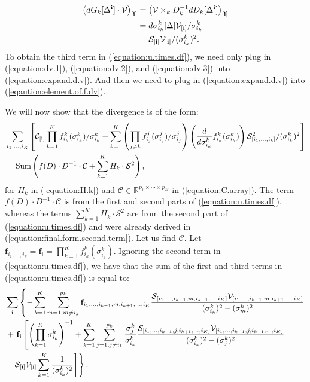 \begin{align}
  \left(dG_k[\Delta^{\bf i}] \cdot \mathcal{V}\right)_{[\mathbf{i}]} &= \left(\mathcal{V} \times_k D_k^{-1}dD_k[\Delta^{\bf i}]\right)_{[\mathbf{i}]}\nonumber\\
  &= d\sigma_{i_k}^k[\Delta] \mathcal{V}_{[\mathbf{i}]}/\sigma_{i_k}^k\nonumber\\
  &= \mathcal{S}_{[\mathbf{i}]}\mathcal{V}_{[\mathbf{i}]}/(\sigma_{i_k}^k)^2.\label{equation:dv.3}
\end{align}
To obtain the third term in (\ref{equation:u.times.df}), we need only
plug in (\ref{equation:dv.1}), (\ref{equation:dv.2}), and
(\ref{equation:dv.3}) into (\ref{equation:expand.d.v}). And then we
need to plug in (\ref{equation:expand.d.v}) into
(\ref{eqaution:element.of.f.dv}).

We will now show that the divergence is of the form:
\begin{align}
  &\sum_{i_1,\ldots,i_K} \left[\mathcal{C}_{[\mathbf{i}]}\prod_{k=1}^Kf_{i_k}^k(\sigma_{i_k}^k)/\sigma_{i_k}^k + \sum_{k=1}^K \left(\prod_{j\neq k}f_{i_j}^j(\sigma_{i_j}^j)/\sigma_{i_j}^j\right)\left(\frac{d}{d\sigma_{i_k}^k}f_{i_k}^k(\sigma_{i_k}^k)\right)\mathcal{S}_{[i_1,\ldots,i_k]}^2/(\sigma_{i_k}^k)^2\right]\nonumber\\
  &= \operatorname*{Sum}\left(f(D) \cdot D^{-1}\cdot \mathcal{C} + \sum_{k=1}^KH_k \cdot \mathcal{S}^2\right), \nonumber
\end{align}
for $H_k$ in (\ref{equation:H.k}) and $\mathcal{C} \in
\mathbb{R}^{p_1\times\cdots\times p_K}$ in
(\ref{equation:C.array}). The term $f(D) \cdot D^{-1}\cdot
\mathcal{C}$ is from the first and second parts of
(\ref{equation:u.times.df}), whereas the terms $\sum_{k=1}^KH_k \cdot
\mathcal{S}^2$ are from the second part of (\ref{equation:u.times.df})
and were already derived in
(\ref{equation:final.form.second.term}). Let us find $\mathcal{C}$.
Let $\mathbf{f}_{i_1,\ldots,i_k} = \mathbf{f}_{\mathbf{i}} =
\prod_{k=1}^Kf_{i_k}^k(\sigma_{i_k}^k)$. Ignoring the second term in
(\ref{equation:u.times.df}), we have that the sum of the first and
third terms in (\ref{equation:u.times.df}) is equal to:
\begin{align*}
  \begin{split}
    &\sum_{\bf i} \left\{ -\sum_{k=1}^K  \sum_{m=1,m\neq i_k}^{p_k} \mathbf{f}_{i_1,\ldots,i_{k-1},m,i_{k+1},\ldots,i_K}\frac{\mathcal{S}_{[i_1,\ldots,i_{k-1},m,i_{k+1},\ldots,i_K]}\mathcal{V}_{[i_1,\ldots,i_{k-1},m,i_{k+1},\ldots,i_K]}}{(\sigma_{i_k}^k)^2 - (\sigma_{m}^k)^2} \right.\\
    &\left. +\ \mathbf{f}_{\bf i}\left[ \left(\prod_{k=1}^K \sigma_{i_k}^k\right)^{-1} + \sum_{k=1}^K \sum_{j = 1, j\neq i_k}^{p_k} \frac{\sigma_j^k}{\sigma_{i_k}^k} \frac{\mathcal{S}_{[i_1,\ldots,i_{k-1},j,i_{k+1},\ldots,i_K]}\mathcal{V}_{[i_1,\ldots,i_{k-1},j,i_{k+1},\ldots,i_K]}}{(\sigma_{i_k}^k)^2 - (\sigma_{j}^k)^2}\right.\right.\\
    &\left.\left.- \mathcal{S}_{\bf [i]} \mathcal{V}_{\bf [i]}\sum_{k=1}^K \frac{1}{(\sigma_{i_k}^k)^2}\right]\right\}.
  \end{split}
\end{align*}
